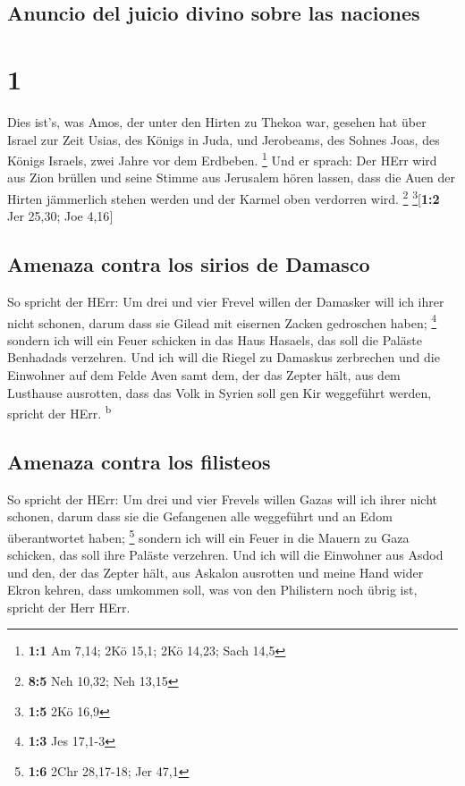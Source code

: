 \hypertarget{anuncio-del-juicio-divino-sobre-las-naciones}{%
\subsection{Anuncio del juicio divino sobre las
naciones}\label{anuncio-del-juicio-divino-sobre-las-naciones}}

\hypertarget{section}{%
\section{1}\label{section}}

 Dies ist's, was Amos, der unter den Hirten zu Thekoa war,
gesehen hat über Israel zur Zeit Usias, des Königs in Juda, und
Jerobeams, des Sohnes Joas, des Königs Israels, zwei Jahre vor dem
Erdbeben. \footnote{\textbf{1:1} Am 7,14; 2Kö 15,1; 2Kö 14,23; Sach 14,5}
 Und er sprach: Der HErr wird aus Zion brüllen und seine
Stimme aus Jerusalem hören lassen, dass die Auen der Hirten jämmerlich
stehen werden und der Karmel oben verdorren wird. \footnote{\textbf{8:5}
  Neh 10,32; Neh 13,15} \footnote{\textbf{1:5} 2Kö 16,9}{[}\textbf{1:2}
Jer 25,30; Joe 4,16{]}

\hypertarget{amenaza-contra-los-sirios-de-damasco}{%
\subsection{Amenaza contra los sirios de
Damasco}\label{amenaza-contra-los-sirios-de-damasco}}

 So spricht der HErr: Um drei und vier Frevel willen der
Damasker will ich ihrer nicht schonen, darum dass sie Gilead mit
eisernen Zacken gedroschen haben; \footnote{\textbf{1:3} Jes 17,1-3}
 sondern ich will ein Feuer schicken in das Haus Hasaels,
das soll die Paläste Benhadads verzehren.  Und ich will
die Riegel zu Damaskus zerbrechen und die Einwohner auf dem Felde Aven
samt dem, der das Zepter hält, aus dem Lusthause ausrotten, dass das
Volk in Syrien soll gen Kir weggeführt werden, spricht der HErr.
\textsuperscript{b}

\hypertarget{amenaza-contra-los-filisteos}{%
\subsection{Amenaza contra los
filisteos}\label{amenaza-contra-los-filisteos}}

 So spricht der HErr: Um drei und vier Frevels willen
Gazas will ich ihrer nicht schonen, darum dass sie die Gefangenen alle
weggeführt und an Edom überantwortet haben; \footnote{\textbf{1:6} 2Chr
  28,17-18; Jer 47,1}  sondern ich will ein Feuer in die
Mauern zu Gaza schicken, das soll ihre Paläste verzehren. 
Und ich will die Einwohner aus Asdod und den, der das Zepter hält, aus
Askalon ausrotten und meine Hand wider Ekron kehren, dass umkommen soll,
was von den Philistern noch übrig ist, spricht der Herr HErr.


